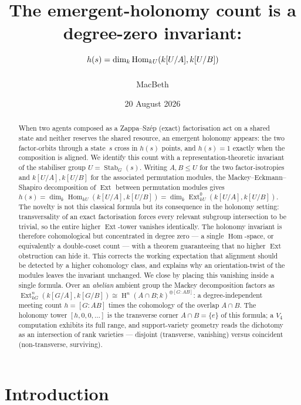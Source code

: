 \documentclass[11pt]{amsart}
\title[Emergent holonomy lives in degree zero]{The emergent-holonomy count is a
degree-zero invariant:\\ $h(s)=\dim_k\Hom_{kU}(k[U/A],k[U/B])$}
\author{MacBeth}
\date{20 August 2026}
\theoremstyle{plain}
\theoremstyle{definition}
\DeclareMathOperator{\Hom}{Hom}
\DeclareMathOperator{\Ext}{Ext}
\DeclareMathOperator{\Stab}{Stab}
\DeclareMathOperator{\Hh}{H}
\begin{document}
\begin{abstract}
When two agents composed as a Zappa--Sz\'ep (exact) factorisation act on a shared
state and neither reserves the shared resource, an emergent holonomy appears: the two
factor-orbits through a state~$s$ cross in $h(s)$ points, and $h(s)=1$ exactly when the
composition is aligned. We identify this count with a representation-theoretic invariant
of the stabiliser group $U=\Stab_G(s)$. Writing $A,B\le U$ for the two factor-isotropies
and $k[U/A],k[U/B]$ for the associated permutation modules, the Mackey--Eckmann--Shapiro
decomposition of $\Ext$ between permutation modules gives
$h(s)=\dim_k\Hom_{kU}(k[U/A],k[U/B])=\dim_k\Ext^0_{kU}(k[U/A],k[U/B])$.
The novelty is not this classical formula but its consequence in the holonomy setting:
transversality of an exact factorisation forces every relevant subgroup intersection to
be trivial, so the entire higher $\Ext$-tower vanishes identically. The holonomy invariant
is therefore cohomological but concentrated in degree zero --- a single $\Hom$-space, or
equivalently a double-coset count --- with a theorem guaranteeing that no higher $\Ext$
obstruction can hide it. This corrects the working expectation that alignment should be
detected by a higher cohomology class, and explains why an orientation-twist of the
modules leaves the invariant unchanged.
We close by placing this vanishing inside a single formula. Over an \emph{abelian}
ambient group the Mackey decomposition factors as
$\Ext^n_{kG}(k[G/A],k[G/B])\cong\Hh^n(A\cap B;k)^{\oplus[G:AB]}$: a degree-independent
meeting count $h=[G:AB]$ times the cohomology of the overlap $A\cap B$. The holonomy
tower $[h,0,0,\dots]$ is the transverse corner $A\cap B=\{e\}$ of this formula; a
$V_4$ computation exhibits its full range, and support-variety geometry reads the
dichotomy as an intersection of rank varieties --- disjoint (transverse, vanishing)
versus coincident (non-transverse, surviving).
\end{abstract}

\maketitle

\section{Introduction}
\end{document}
